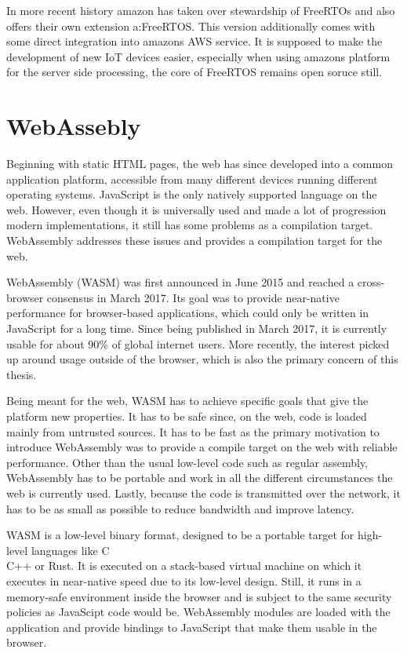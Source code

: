 In more recent history amazon has taken over stewardship of FreeRTOs and also offers their own extension a:FreeRTOS\autocite{lardinois_amazon_nodate}. This version additionally comes with some direct integration into amazons AWS service\autocite{noauthor_freertos_nodate-1}. It is supposed to make the development of new IoT devices easier, especially when using amazons platform for the server side processing, the core of FreeRTOS remains open soruce still.
\section{WebAssebly}
Beginning with static HTML pages, the web has since developed into a common application platform, accessible from many different devices running different operating systems. JavaScript is the only natively supported language on the web. However, even though it is universally used and made a lot of progression modern implementations, it still has some problems as a compilation target. WebAssembly addresses these issues and provides a compilation target for the web.

WebAssembly (WASM) was first announced in June 2015 and reached a cross-browser consensus in March 2017. Its goal was to provide near-native performance for browser-based applications, which could only be written in JavaScript for a long time. Since being published in March 2017, it is currently usable for about 90\% of global internet users. More recently, the interest picked up around usage outside of the browser, which is also the primary concern of this thesis.

Being meant for the web, WASM has to achieve specific goals that give the platform new properties. It has to be safe since, on the web, code is loaded mainly from untrusted sources. It has to be fast as the primary motivation to introduce WebAssembly was to provide a compile target on the web with reliable performance. Other than the usual low-level code such as regular assembly, WebAssembly has to be portable and work in all the different circumstances the web is currently used. Lastly, because the code is transmitted over the network, it has to be as small as possible to reduce bandwidth and improve latency.

WASM is a low-level binary format, designed to be a portable target for high-level languages like C\\C++ or Rust. It is executed on a stack-based virtual machine on which it executes in near-native speed due to its low-level design. Still, it runs in a memory-safe environment inside the browser and is subject to the same security policies as JavaScipt code would be. WebAssembly modules are loaded with the application and provide bindings to JavaScript that make them usable in the browser.

